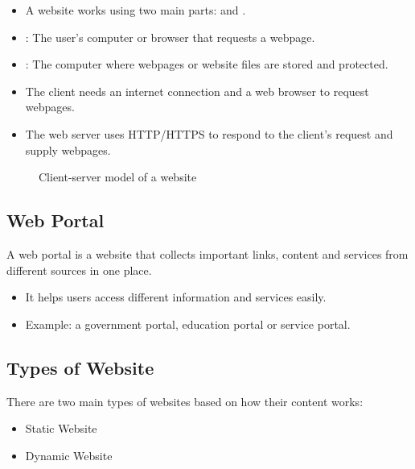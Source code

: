 \begin{itemize}
    \item A website works using two main parts:  and .
    \item {}: The user's computer or browser that requests a webpage.
    \item {}: The computer where webpages or website files are stored and protected.
    \item The client needs an internet connection and a web browser to request webpages.
    \item The web server uses HTTP/HTTPS to respond to the client's request and supply webpages.
\end{itemize}

\begin{figure}[H]
    \centering
    \caption{Client-server model of a website}
    \label{fig:client-server-model}
\end{figure}

\subsection{Web Portal}

\begin{definitionbox}
A web portal is a website that collects important links, content and services from different sources in one place.
\end{definitionbox}

\begin{itemize}
    \item It helps users access different information and services easily.
    \item Example: a government portal, education portal or service portal.
\end{itemize}


\subsection{Types of Website}

There are two main types of websites based on how their content works:

\begin{itemize}
    \item Static Website
    \item Dynamic Website
\end{itemize}

